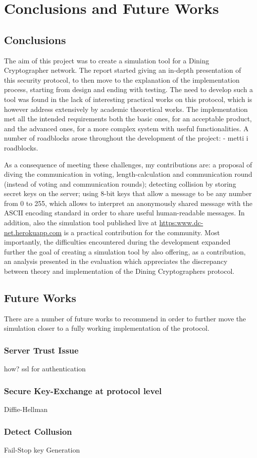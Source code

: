 \chapter{Conclusions and Future Works}

\section{Conclusions}
The aim of this project was to create a simulation tool for a Dining Cryptographer network. The report started giving an in-depth presentation of this security protocol, to then move to the explanation of the implementation process, starting from design and ending with testing. The need to develop such a tool was found in the lack of interesting practical works on this protocol, which is however address extensively by academic theoretical works. The implementation met all the intended requirements both the basic ones, for an acceptable product, and the advanced ones, for a more complex system with useful functionalities. A number of roadblocks arose throughout the development of the project: - metti i roadblocks. 

As a consequence of meeting these challenges, my contributions are: a proposal of diving the communication in voting, length-calculation and communication round (instead of voting and communication rounds); detecting collision by storing secret keys on the server; using 8-bit keys that allow a message to be any number from 0 to 255, which allows to interpret an anonymously shared message with the ASCII encoding standard in order to share useful human-readable messages. In addition, also the simulation tool published live at \url{https:www.dc-net.herokuapp.com} is a practical contribution for the community. Most importantly, the difficulties encountered during the development expanded further the goal of creating a simulation tool by also offering, as a contribution, an analysis presented in the evaluation which appreciates the discrepancy between theory and implementation of the Dining Cryptographers protocol.

\section{Future Works}
There are a number of future works to recommend in order to further move the simulation closer to a fully working implementation of the protocol.


\subsection{Server Trust Issue}
how? ssl for authentication

\subsection{Secure Key-Exchange at protocol level}
Diffie-Hellman

\subsection{Detect Collusion}
Fail-Stop key Generation